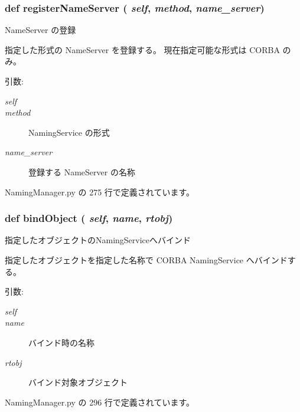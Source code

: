 \subsubsection{\setlength{\rightskip}{0pt plus 5cm}def registerNameServer ( {\em self},  {\em method},  {\em name\_\-server})}\label{classsource__py_1_1_naming_manager_1_1_naming_manager_7d2d32863d12daf4166164a76a6e0e8a}


NameServer の登録 

指定した形式の NameServer を登録する。 現在指定可能な形式は CORBA のみ。

\begin{Desc}
\item[引数:]
\begin{description}
\item[{\em self}]\item[{\em method}]NamingService の形式 \item[{\em name\_\-server}]登録する NameServer の名称 \end{description}
\end{Desc}


 NamingManager.py の 275 行で定義されています。
\subsubsection{\setlength{\rightskip}{0pt plus 5cm}def bindObject ( {\em self},  {\em name},  {\em rtobj})}\label{classsource__py_1_1_naming_manager_1_1_naming_manager_5a4a94fdd171a5f454d99c5234a5f757}


指定したオブジェクトのNamingServiceへバインド 

指定したオブジェクトを指定した名称で CORBA NamingService へバインドする。

\begin{Desc}
\item[引数:]
\begin{description}
\item[{\em self}]\item[{\em name}]バインド時の名称 \item[{\em rtobj}]バインド対象オブジェクト \end{description}
\end{Desc}


 NamingManager.py の 296 行で定義されています。
